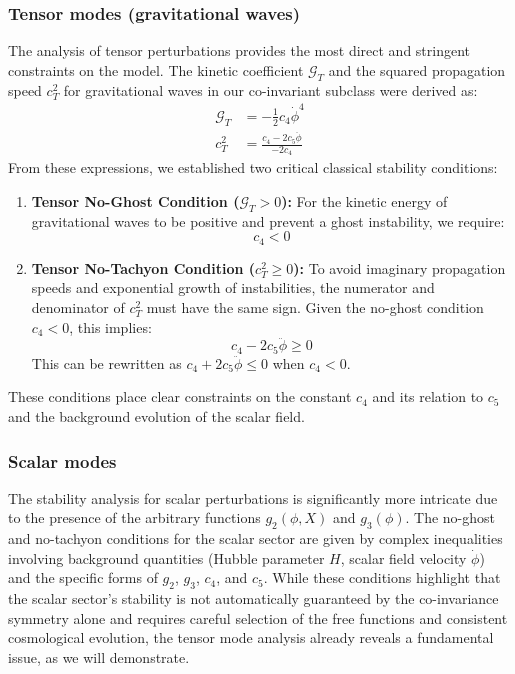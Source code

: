 \documentclass[twocolumn]{aastex631}
\begin{document}
\subsubsection{Tensor modes (gravitational waves)}
The analysis of tensor perturbations provides the most direct and stringent constraints on the model. The kinetic coefficient $\mathcal{G}_T$ and the squared propagation speed $c_T^2$ for gravitational waves in our co-invariant subclass were derived as:
\begin{align}
    \mathcal{G}_T &= -\frac{1}{2} c_4 \dot{\phi}^4 \\
    c_T^2 &= \frac{c_4 - 2c_5\ddot{\phi}}{-2c_4}
\end{align}
From these expressions, we established two critical classical stability conditions:
\begin{enumerate}
    \item \textbf{Tensor No-Ghost Condition ($\mathcal{G}_T > 0$):} For the kinetic energy of gravitational waves to be positive and prevent a ghost instability, we require:
    \begin{equation}
        c_4 < 0
    \end{equation}
    \item \textbf{Tensor No-Tachyon Condition ($c_T^2 \ge 0$):} To avoid imaginary propagation speeds and exponential growth of instabilities, the numerator and denominator of $c_T^2$ must have the same sign. Given the no-ghost condition $c_4 < 0$, this implies:
    \begin{equation}
        c_4 - 2c_5\ddot{\phi} \ge 0
    \end{equation}
    This can be rewritten as $c_4 + 2c_5\ddot{\phi} \le 0$ when $c_4 < 0$.
\end{enumerate}
These conditions place clear constraints on the constant $c_4$ and its relation to $c_5$ and the background evolution of the scalar field.

\subsubsection{Scalar modes}
The stability analysis for scalar perturbations is significantly more intricate due to the presence of the arbitrary functions $g_2(\phi, X)$ and $g_3(\phi)$. The no-ghost and no-tachyon conditions for the scalar sector are given by complex inequalities involving background quantities (Hubble parameter $H$, scalar field velocity $\dot{\phi}$) and the specific forms of $g_2$, $g_3$, $c_4$, and $c_5$. While these conditions highlight that the scalar sector's stability is not automatically guaranteed by the co-invariance symmetry alone and requires careful selection of the free functions and consistent cosmological evolution, the tensor mode analysis already reveals a fundamental issue, as we will demonstrate.
\end{document}

